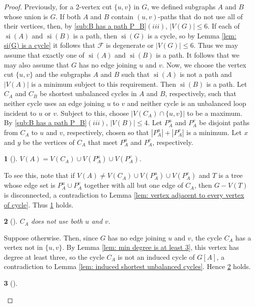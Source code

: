 \documentclass[12pt]{article}
\theoremstyle{definition}
\theoremstyle{plain} %
\newtheorem{subtheorem}{}[theorem]
\newcommand{\cF}{\mathcal{F}}
\begin{document}
\begin{proof}
Previously, for a 2-vertex cut $\{u,v\}$ in $G$, we defined subgraphs $A$ and
$B$ whose union is $G$. If both $A$ and $B$ contain $(u,v)$-paths that do not use
all of their vertices, then, by \ref{sub:B has a path P_B}$(iii)$, $|V(G)| \le 6$. If each of $\operatorname{si}(A)$ and
$\operatorname{si}(B)$ is a path, then $\operatorname{si}(G)$ is a cycle, so by Lemma \ref{lem: si(G) is a cycle} it follows that $\cF$ is degenerate or $|V(G)| \le 6$. Thus we may assume that exactly one of $\operatorname{si}(A)$ and $\operatorname{si}(B)$
is a path. It follows that we may also assume that $G$ has no edge joining
$u$ and $v$. Now, we choose the vertex cut $\{u,v\}$ and the subgraphs $A$ and
$B$ such that $\operatorname{si}(A)$ is not a path and $|V(A)|$ is a minimum subject to this
requirement. Then $\operatorname{si}(B)$ is a path. Let $C_A$ and $C_B$ be shortest unbalanced
cycles in $A$ and $B$, respectively, such that neither cycle uses an edge joining
$u$ to $v$ and neither cycle is an unbalanced loop incident to $u$ or $v$. Subject to
this, choose $|V(C_A) \cap \{u,v\}|$ to be a maximum. By \ref{sub:B has a path P_B}$(iii)$, $|V(B)| \le 4$.
Let $P_A^u$ and $P_A^v$ be disjoint paths from $C_A$ to $u$ and $v$, respectively, chosen
so that $|P_A^u| + |P_A^v|$ is a minimum. Let $x$ and $y$ be the vertices of $C_A$ that
meet $P_A^u$ and $P_A^v$, respectively.
\begin{subtheorem}[{\cite[3.5.3]{Fife-Mayhew-Oxley-Semple2020}}]\label{sub: V(A)}
    $V(A)=V(C_A)\cup V(P^u_A)\cup V(P^v_A)$.
\end{subtheorem}
To see this, note that if $V(A) \neq V(C_A)\cup V(P^u_A)\cup V(P^v_A)$ and $T$ is a tree whose edge set is $P^u_A \cup P^v_A$ together with all but one edge of $C_A$, then $G-V(T)$ is disconnected, a contradiction to Lemma \ref{lem: vertex adjacent to every vertex of cycle}. Thus \ref{sub: V(A)} holds.
\begin{subtheorem}[{\cite[3.5.4]{Fife-Mayhew-Oxley-Semple2020}}]\label{sub:C_A does not use both}
    $C_A$ does not use both $u$ and $v$.
\end{subtheorem}
Suppose otherwise. Then, since $G$ has no edge joining $u$ and $v$, the cycle $C_A$ has a vertex not in $\{u,v\}$. By Lemma \ref{lem: min degree is at least 3}, this vertex has degree at least three, so the cycle $C_A$ is not an induced cycle of $G[A]$, a contradiction to Lemma \ref{lem: induced shortest unbalanced cycles}. Hence \ref{sub:C_A does not use both} holds.   
\begin{subtheorem}[{\cite[3.5.5]{Fife-Mayhew-Oxley-Semple2020}}]\label{sub:If u not in V(C_A)}

\end{subtheorem}
\end{proof}
\end{document}
